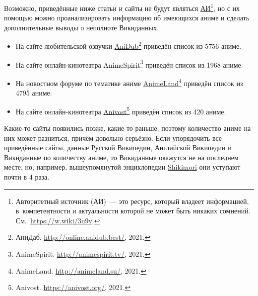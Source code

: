 Возможно, приведённые ниже статьи и сайты не будут являться \href{https://w.wiki/3u9v}{АИ}\footnote{%
    Авторитетный источник (АИ)~--- это ресурс, который владеет информацией, 
    в~компетентности и актуальности которой не может быть никаких сомнений. 
    См.~\href{https://w.wiki/3u9v}{https://w.wiki/3u9v}.%
%
}, но с их помощью можно проанализировать информацию об имеющихся аниме и сделать дополнительные выводы о неполноте Викиданных.


\begin{itemize}
	\item На сайте любительской озвучки \href{http://online.anidub.best/}{AniDub}\footnote{АниДаб. \href{http://online.anidub.best/}{http://online.anidub.best/}, 2021.} приведён список из \num{5756} аниме.
	\item На сайте онлайн-кинотеатра \href{http://animespirit.tv/}{AnimeSpirit}\footnote{AnimeSpirit. \href{http://animespirit.tv/}{http://animespirit.tv/}, 2021.} приведён список из \num{1968} аниме.
	\item На новостном форуме по тематике аниме \href{http://animeland.su/}{AnimeLand}\footnote{AnimeLand. \href{http://animeland.su/}{http://animeland.su/}, 2021.} приведён список из \num{4795} аниме.
	\item На сайте онлайн-кинотеатра \href{https://anivost.org/}{Anivost}\footnote{Anivost. \href{https://anivost.org/}{https://anivost.org/}, 2021.} приведён список из 420 аниме.
\end{itemize}

Какие-то сайты появились позже, какие-то раньше, поэтому количество аниме на них может разниться, причём довольно серьёзно. Если упорядочить все приведённые сайты, данные Русской Википедии, Английской Википедии и Викиданные по количеству аниме, то Викиданные окажутся не на последнем месте, но, например, вышеупомянутой энциклопедии \href{https://shikimori.one/}{Shikimori} они уступают почти в 4 раза.



